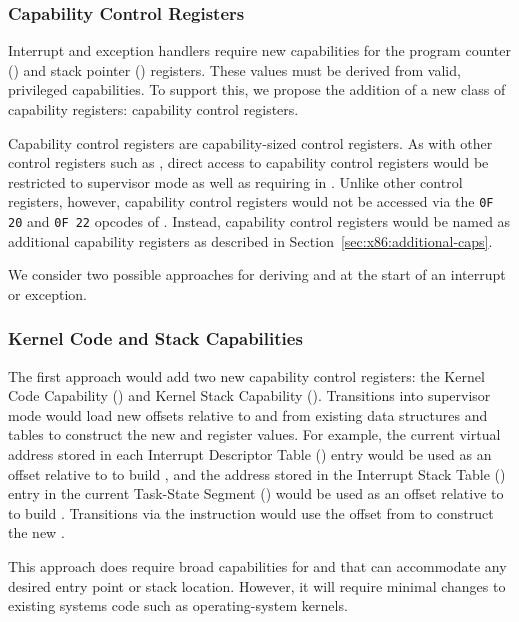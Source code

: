 \subsubsection{Capability Control Registers}
\label{sec:x86:capability-control-registers}

Interrupt and exception handlers require new capabilities for the
program counter (\CIP{}) and stack pointer (\CSP{}) registers.  These
values must be derived from valid, privileged capabilities.  To
support this, we propose the addition of a new class of capability
registers: capability control registers.

Capability control registers are capability-sized control registers.
As with other control registers such as \CRFOUR, direct access to
capability control registers would be restricted to supervisor mode as
well as requiring \cappermASR{} in \CIP{}.  Unlike other control
registers, however, capability control registers would not be accessed
via the \texttt{0F 20} and \texttt{0F 22} opcodes of .
Instead, capability control registers would be named as additional
capability registers as described in
Section~\ref{sec:x86:additional-caps}.

We consider two possible approaches for deriving \CIP{} and \CSP{} at
the start of an interrupt or exception.

\subsubsection{Kernel Code and Stack Capabilities}

The first approach would add two new capability control registers: the Kernel
Code Capability (\KCC{}) and Kernel Stack Capability (\KSC{}).  Transitions into
supervisor mode would load new offsets relative to \KCC{} and \KSC{} from
existing data structures and tables to construct the new \CIP{} and \CSP{}
register values.  For example, the current virtual address stored in
each Interrupt Descriptor Table (\IDT{}) entry would be used as an offset
relative to \KCC{} to build \CIP{}, and the address stored in the Interrupt
Stack Table (\IST{}) entry in the current Task-State Segment (\TSS{}) would
be used as an offset relative to \KSC{} to build \CSP{}.  Transitions via
the  instruction would use the offset from \LSTAR{} to
construct the new \CIP{}.

This approach does require broad capabilities
for \KCC{} and \KSC{} that can accommodate any desired entry point or stack
location.  However, it will require minimal changes to existing systems
code such as operating-system kernels.

